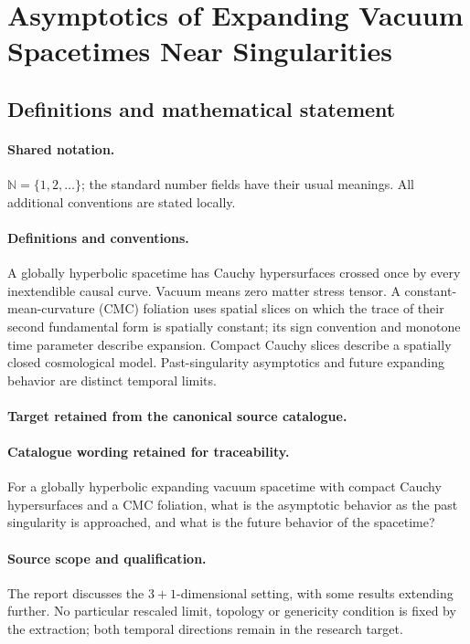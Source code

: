 \documentclass[11pt]{article}
\begin{document}
\section{Asymptotics of Expanding Vacuum Spacetimes Near Singularities}\label{statement}

\subsection{Definitions and mathematical statement}

\paragraph{Shared notation.}$\mathbb N=\{1,2,\ldots\}$; the standard number fields have their usual meanings. All additional conventions are stated locally.


\paragraph{Definitions and conventions.}
A globally hyperbolic spacetime has Cauchy hypersurfaces crossed once by every inextendible causal curve. Vacuum means zero matter stress tensor. A constant-mean-curvature (CMC) foliation uses spatial slices on which the trace of their second fundamental form is spatially constant; its sign convention and monotone time parameter describe expansion. Compact Cauchy slices describe a spatially closed cosmological model. Past-singularity asymptotics and future expanding behavior are distinct temporal limits.

\paragraph{Target retained from the canonical source catalogue.}
\paragraph{Catalogue wording retained for traceability.}
For a globally hyperbolic expanding vacuum spacetime with compact Cauchy hypersurfaces and a CMC foliation, what is the asymptotic behavior as the past singularity is approached, and what is the future behavior of the spacetime?

\paragraph{Source scope and qualification.}
The report discusses the $3+1$-dimensional setting, with some results extending further. No particular rescaled limit, topology or genericity condition is fixed by the extraction; both temporal directions remain in the research target.
\end{document}
